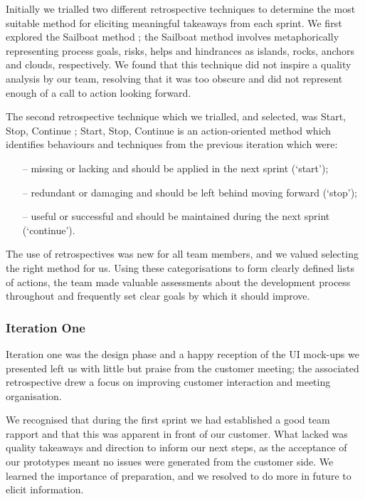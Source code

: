 \documentclass{l3proj}
\begin{document}
Initially we trialled two different retrospective techniques to determine the most suitable method for eliciting meaningful takeaways from each sprint. We first explored the Sailboat method \cite[p21]{Sailboat}; the Sailboat method involves metaphorically representing process goals, risks, helps and hindrances as islands, rocks, anchors and clouds, respectively. We found that this technique did not inspire a quality analysis by our team, resolving that it was too obscure and did not represent enough of a call to action looking forward.

The second retrospective technique which we trialled, and selected, was Start, Stop, Continue \cite{SSC}; Start, Stop, Continue is an action-oriented method which identifies behaviours and techniques from the previous iteration which were:

\begin{itemize}
    \item[--]missing or lacking and should be applied in the next sprint (`start');
    \item[--]redundant or damaging and should be left behind moving forward (`stop');
    \item[--]useful or successful and should be maintained during the next sprint (`continue').
\end{itemize}

The use of retrospectives was new for all team members, and we valued selecting the right method for us. Using these categorisations to form clearly defined lists of actions, the team made valuable assessments about the development process throughout and frequently set clear goals by which it should improve. 


\subsubsection{Iteration One}\label{sec:3.4.2}
Iteration one was the design phase and a happy reception of the UI mock-ups we presented left us with little but praise from the customer meeting; the associated retrospective drew a focus on improving customer interaction and meeting organisation.

We recognised that during the first sprint we had established a good team rapport and that this was apparent in front of our customer. What lacked was quality takeaways and direction to inform our next steps, as the acceptance of our prototypes meant no issues were generated from the customer side. We learned the importance of preparation, and we resolved to do more in future to elicit information.
\end{document}
